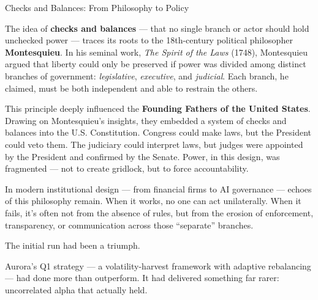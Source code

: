 \begin{HistoricalSidebar}{Checks and Balances: From Philosophy to Policy}

  The idea of \textbf{checks and balances} — that no single branch or actor should hold unchecked power — traces its 
  roots to the 18th-century political philosopher \textbf{Montesquieu}. In his seminal work, \textit{The Spirit of the 
  Laws} (1748), Montesquieu argued that liberty could only be preserved if power was divided among distinct branches 
  of government: \textit{legislative}, \textit{executive}, and \textit{judicial}. Each branch, he claimed, must be 
  both independent and able to restrain the others.
  
  This principle deeply influenced the \textbf{Founding Fathers of the United States}. Drawing on Montesquieu’s insights, 
  they embedded a system of checks and balances into the U.S. Constitution. Congress could make laws, but the President 
  could veto them. The judiciary could interpret laws, but judges were appointed by the President and confirmed by the 
  Senate. Power, in this design, was fragmented — not to create gridlock, but to force accountability.
  
  \medskip
  
  In modern institutional design --- from financial firms to AI governance --- echoes of this philosophy remain. When it works, 
  no one can act unilaterally. When it fails, it’s often not from the absence of rules, but from the erosion of enforcement, 
  transparency, or communication across those “separate” branches.
  
\end{HistoricalSidebar}

\medskip

The initial run had been a triumph.

Aurora’s Q1 strategy — a volatility-harvest framework with adaptive rebalancing — had done more than 
outperform. It had delivered something far rarer: uncorrelated alpha that actually held.

\medskip

